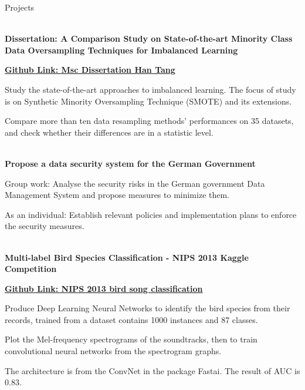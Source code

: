 \documentclass{resume} %
\begin{document}
\begin{rSection}{Projects}

\\{\bf Dissertation: A Comparison Study on State-of-the-art Minority Class Data Oversampling Techniques for Imbalanced Learning }

\href{https://github.com/HirahTang/MScDissertation_Han_Tang}{\bf Github Link: Msc Dissertation Han Tang}

Study the state-of-the-art approaches to imbalanced learning. The focus of study is on Synthetic Minority Oversampling Technique (SMOTE) and its extensions.

Compare more than ten data resampling methods' performances on 35 datasets, and check whether their differences are in a statistic level.



\\
{\bf Propose a data security system for the German Government}

Group work: Analyse the security risks in the German government Data Management System and propose measures to minimize them.

As an individual: Establish relevant policies and implementation plans to enforce the security measures.

\\{\bf Multi-label Bird Species Classification - NIPS 2013 Kaggle Competition}

\href{https://github.com/HirahTang/NIPS-2013-Bird-song-classification}{\bf Github Link: NIPS 2013 bird song classification}

Produce Deep Learning Neural Networks to identify the bird species from their records, trained from a dataset contains 1000 instances and 87 classes.

Plot the Mel-frequency spectrograms of the soundtracks, then to train convolutional neural networks from the spectrogram graphs.

The architecture is from the ConvNet in the package Fastai. The result of AUC is 0.83.









\end{rSection}
\end{document}
